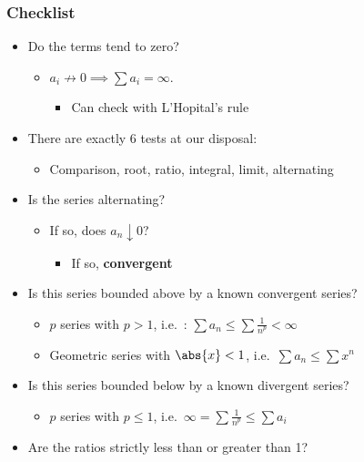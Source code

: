 \hypertarget{checklist-1}{%
\subsubsection{Checklist}\label{checklist-1}}

\begin{itemize}
\tightlist
\item
  Do the terms tend to zero?

  \begin{itemize}
  \tightlist
  \item
    \(a_i \not\to 0 \implies \sum a_i = \infty\).

    \begin{itemize}
    \tightlist
    \item
      Can check with L'Hopital's rule
    \end{itemize}
  \end{itemize}
\item
  There are exactly 6 tests at our disposal:

  \begin{itemize}
  \tightlist
  \item
    Comparison, root, ratio, integral, limit, alternating
  \end{itemize}
\item
  Is the series alternating?

  \begin{itemize}
  \tightlist
  \item
    If so, does \(a_n \downarrow 0\)?

    \begin{itemize}
    \tightlist
    \item
      If so, \textbf{convergent}
    \end{itemize}
  \end{itemize}
\item
  Is this series bounded above by a known convergent series?

  \begin{itemize}
  \tightlist
  \item
    \(p\) series with \(p>1\), i.e.~:
    \(\sum a_n \leq \sum \frac{1}{n^p} < \infty\)
  \item
    Geometric series with \(\abs{x} < 1\),
    i.e.~\(\sum a_n \leq \sum x^n\)
  \end{itemize}
\item
  Is this series bounded below by a known divergent series?

  \begin{itemize}
  \tightlist
  \item
    \(p\) series with \(p\leq 1\),
    i.e.~\(\infty = \sum \frac{1}{n^p} \leq \sum a_i\)
  \end{itemize}
\item
  Are the ratios strictly less than or greater than 1?


\end{itemize}
